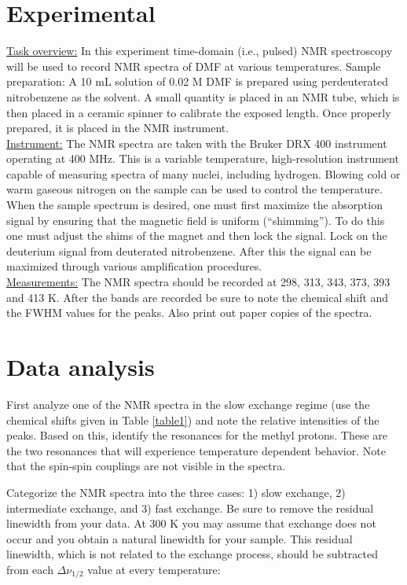 \documentclass[byrevtex,amssymb,aps,pra,floatfix,letterpaper]{revtex4}
\begin{document}
\section{Experimental}

\noindent
\underline{Task overview:} In this experiment time-domain (i.e., pulsed) NMR spectroscopy will be used to record NMR spectra of DMF at various temperatures.
Sample preparation: A 10 mL solution of 0.02 M DMF is prepared using perdeuterated nitrobenzene as the solvent. A small quantity is placed in an NMR tube, which is then placed in a ceramic spinner to calibrate the exposed length. Once properly prepared, it is placed in the NMR instrument.\\

\noindent
\underline{Instrument:} The NMR spectra are taken with the Bruker DRX 400 instrument operating at 400 MHz. This is a variable temperature, high-resolution instrument capable of measuring spectra of many nuclei, including hydrogen. Blowing cold or warm gaseous nitrogen on the sample can be used to control the temperature. When the sample spectrum is desired, one must first maximize the absorption signal by ensuring that the magnetic field is uniform (``shimming''). To do this one must adjust the shims of the magnet and then lock the signal. Lock on the deuterium signal from deuterated nitrobenzene. After this the signal can be maximized through various amplification procedures.\\

\noindent
\underline{Measurements:} The NMR spectra should be recorded at 298, 313, 343, 373, 393 and 413 K. After the bands are recorded be sure to note the chemical shift and the FWHM values for the peaks. Also print out paper copies of the spectra.

\section{Data analysis}

First analyze one of the NMR spectra in the slow exchange regime (use the chemical shifts given in Table \ref{table1}) and note the relative intensities of the peaks. Based on this, identify the resonances for the methyl protons. These are the two resonances that will experience temperature dependent behavior. Note that the spin-spin couplings are not visible in the spectra.

Categorize the NMR spectra into the three cases: 1) slow exchange, 2) intermediate exchange, and 3) fast exchange. Be sure to remove the residual linewidth from your data. At 300 K you may assume that exchange does not occur and you obtain a natural linewidth for your sample. This residual linewidth, which is not related to the exchange process, should be subtracted from each $\Delta\nu_{1/2}$ value at every temperature:
\end{document}

